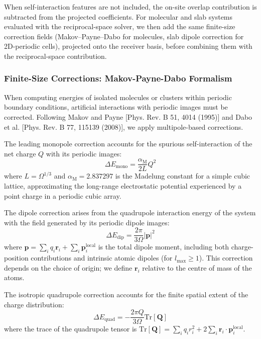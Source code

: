 \documentclass[aps,%
superscriptaddress,
 amsmath,amssymb,
floatfix,
twocolumn
]{revtex4-2}
\begin{document}
When self-interaction features are not included, the on-site overlap contribution is subtracted from the projected coefficients. For molecular and slab systems evaluated with the reciprocal-space solver, we then add the same finite-size correction fields (Makov--Payne--Dabo for molecules, slab dipole correction for 2D-periodic cells), projected onto the receiver basis, before combining them with the reciprocal-space contribution.


\subsubsection{Finite-Size Corrections: Makov-Payne-Dabo Formalism}

When computing energies of isolated molecules or clusters within periodic boundary conditions, artificial interactions with periodic images must be corrected. Following Makov and Payne [Phys. Rev. B 51, 4014 (1995)] and Dabo et al. [Phys. Rev. B 77, 115139 (2008)], we apply multipole-based corrections.

The leading monopole correction accounts for the spurious self-interaction of the net charge $Q$ with its periodic images:
\begin{equation}
\Delta E_{\text{mono}} = \frac{\alpha_{\text{M}}}{2L} Q^2
\end{equation}
where $L = \Omega^{1/3}$ and $\alpha_{\text{M}} = 2.837297$ is the Madelung constant for a simple cubic lattice, approximating the long-range electrostatic potential experienced by a point charge in a periodic cubic array.

The dipole correction arises from the quadrupole interaction energy of the system with the field generated by its periodic dipole images:
\begin{equation}
\Delta E_{\text{dip}} = \frac{2\pi}{3\Omega} |\mathbf{p}|^2
\end{equation}
where $\mathbf{p} = \sum_i q_i \mathbf{r}_i + \sum_i \mathbf{p}_i^{\text{local}}$ is the total dipole moment, including both charge-position contributions and intrinsic atomic dipoles (for $l_{\text{max}} \geq 1$). This correction depends on the choice of origin; we define $\mathbf{r}_i$ relative to the centre of mass of the atoms.

The isotropic quadrupole correction accounts for the finite spatial extent of the charge distribution:
\begin{equation}
\Delta E_{\text{quad}} = -\frac{2\pi Q}{3\Omega} \text{Tr}[\mathbf{Q}]
\end{equation}
where the trace of the quadrupole tensor is $\text{Tr}[\mathbf{Q}] = \sum_i q_i r_i^2 + 2 \sum_i \mathbf{r}_i \cdot \mathbf{p}_i^{\text{local}}$.
\end{document}
